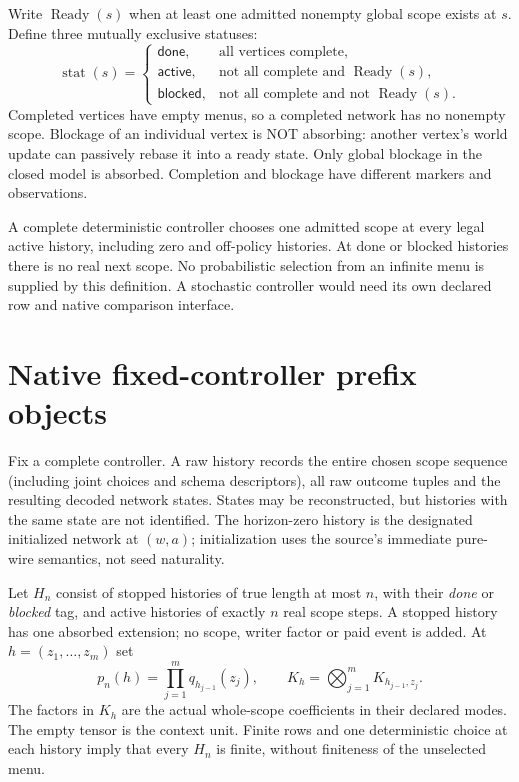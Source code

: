 \documentclass[11pt]{article}
\begin{document}
Write $\operatorname{Ready}(s)$ when at least one admitted nonempty global
scope exists at $s$. Define three mutually exclusive statuses:
\[
 \operatorname{stat}(s)=
 \begin{cases}
 \mathsf{done},&\text{all vertices complete},\\
 \mathsf{active},&\text{not all complete and }\operatorname{Ready}(s),\\
 \mathsf{blocked},&\text{not all complete and not }\operatorname{Ready}(s).
 \end{cases}
\]
Completed vertices have empty menus, so a completed network has no nonempty
scope. Blockage of an individual vertex is NOT absorbing: another vertex's
world update can passively rebase it into a ready state. Only global blockage
in the closed model is absorbed. Completion and blockage have different
markers and observations.

A complete deterministic controller chooses one admitted scope at every
legal active history, including zero and off-policy histories. At done or
blocked histories there is no real next scope. No probabilistic selection
from an infinite menu is supplied by this definition. A stochastic controller
would need its own declared row and native comparison interface.

\section{Native fixed-controller prefix objects}
Fix a complete controller. A raw history records the entire chosen scope
sequence (including joint choices and schema descriptors), all raw outcome
tuples and the resulting decoded network states. States may be reconstructed,
but histories with the same state are not identified. The horizon-zero
history is the designated initialized network at $(w,a)$; initialization
uses the source's immediate pure-wire semantics, not seed naturality.

Let $H_n$ consist of stopped histories of true length at most $n$, with their
\emph{done} or \emph{blocked} tag, and active histories of exactly $n$ real
scope steps. A stopped history has one absorbed extension; no scope, writer
factor or paid event is added. At $h=(z_1,\ldots,z_m)$ set
\[
 p_n(h)=\prod_{j=1}^m q_{h_{j-1}}(z_j),\qquad
 K_h=\bigotimes_{j=1}^m K_{h_{j-1},z_j}.                  \tag{1}
\]
The factors in $K_h$ are the actual whole-scope coefficients in their declared
modes. The empty tensor is the context unit. Finite rows and one deterministic
choice at each history imply that every $H_n$ is finite, without finiteness
of the unselected menu.
\end{document}
